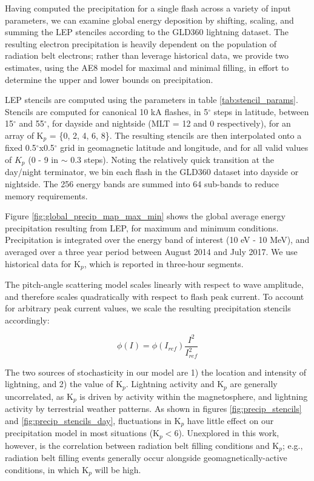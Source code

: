 Having computed the precipitation for a single flash across a variety of input parameters, we can examine global energy deposition by shifting, scaling, and summing the LEP stenciles according to the GLD360 lightning dataset. The resulting electron precipitation is heavily dependent on the population of radiation belt electrons; rather than leverage historical data, we provide two estimates, using the AE8 model for maximal and minimal filling, in effort to determine the upper and lower bounds on precipitation. 

LEP stencils are computed using the parameters in table \ref{tab:stencil_params}. Stencils are computed for canonical 10 kA flashes, in 5$^\circ$ steps in latitude, between 15$^\circ$ and 55$^\circ$, for dayside and nightside (MLT = 12 and 0 respectively), for an array of K$_p$ = \{0, 2, 4, 6, 8\}. The resulting stencils are then interpolated onto a fixed 0.5$^\circ$x0.5$^\circ$ grid in geomagnetic latitude and longitude, and for all valid values of $K_p$ (0 - 9 in $\sim$ 0.3 steps). Noting the relatively quick transition at the day/night terminator, we bin each flash in the GLD360 dataset into dayside or nightside. The 256 energy bands are summed into 64 sub-bands to reduce memory requirements. 

Figure \ref{fig:global_precip_map_max_min} shows the global average energy precipitation resulting from LEP, for maximum and minimum conditions. Precipitation is integrated over the energy band of interest (10 eV - 10 MeV), and averaged over a three year period between August 2014 and July 2017. We use historical data for K$_p$, which is reported in three-hour segments.

The pitch-angle scattering model scales linearly with respect to wave amplitude, and therefore scales quadratically with respect to flash peak current. To account for arbitrary peak current values, we scale the resulting precipitation stencils accordingly:

\begin{equation}
\phi(I) = \phi(I_{ref})\frac{I^2}{I_{ref}^2} 
\end{equation}

The two sources of stochasticity in our model are 1) the location and intensity of lightning, and 2) the value of K$_p$. Lightning activity and K$_p$ are generally uncorrelated, as K$_p$ is driven by activity within the magnetosphere, and lightning activity by terrestrial weather patterns. As shown in figures \ref{fig:precip_stencils} and \ref{fig:precip_stencils_day}, fluctuations in K$_p$ have little effect on our precipitation model in most situations (K$_p < 6$). Unexplored in this work, however, is the correlation between radiation belt filling conditions and K$_p$; e.g., radiation belt filling events generally occur alongside geomagnetically-active conditions, in which K$_p$ will be high.

